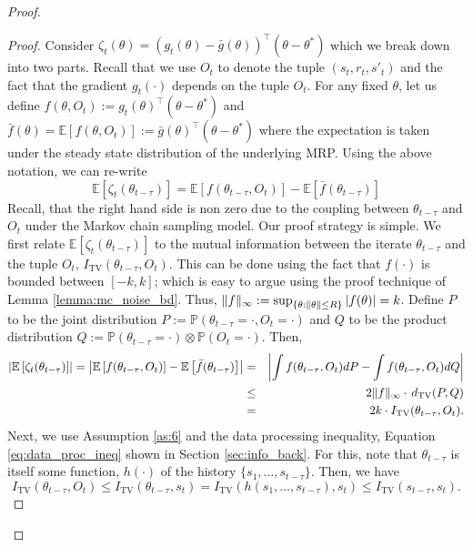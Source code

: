 \documentclass{colt2018} %
\begin{document}
\begin{proof}
\begin{proof}
Consider $\zeta_t(\theta) = \left(g_t(\theta) - \bar{g}(\theta)\right)^\top(\theta - \theta^*)$ which we break down into two parts. Recall that we use $O_t$ to denote the tuple $(s_t,r_t,s'_t)$ and the fact that the gradient $g_t(\cdot)$ depends on the tuple $O_t$. For any fixed $\theta$, let us define $f(\theta, O_t) := g_t(\theta)^\top(\theta - \theta^*)$ and $\bar{f}(\theta) = \mathbb{E} \left[ f(\theta, O_t) \right] := \bar{g}(\theta)^\top (\theta - \theta^*)$ where the expectation is taken under the steady state distribution of the underlying MRP. Using the above notation, we can re-write
\[
\mathbb{E} \left[ \zeta_t(\theta_{t-\tau}) \right] = \mathbb{E} \left[f(\theta_{t-\tau}, O_t)\right] - \mathbb{E} \left[\bar{f}(\theta_{t-\tau})\right]
\]
Recall, that the right hand side is non zero due to the coupling between $\theta_{t-\tau}$ and $O_t$ under the Markov chain sampling model. Our proof strategy is simple. We first relate $\mathbb{E} \left[ \zeta_t(\theta_{t-\tau}) \right]$ to the mutual information between the iterate $\theta_{t-\tau}$ and the tuple $O_t$, $I_{\text{TV}}(\theta_{t-\tau},O_{t})$. This can be done using the fact that $f(\cdot)$ is bounded between $[-k,k]$; which is easy to argue using the proof technique of Lemma \ref{lemma:mc_noise_bd}. Thus, $\| f \|_{\infty} := \sup_{ \{\theta : \norm{\theta} \leq R\} } \abs{f(\theta)} = k$. Define $P$ to be the joint distribution $P := \mathbb{P}(\theta_{t-\tau}=\cdot , O_t=\cdot)$ and $Q$ to be the product distribution $Q := \mathbb{P}(\theta_{t-\tau}=\cdot) \otimes \mathbb{P}(O_t=\cdot)$. Then,
\begin{eqnarray*}
\abs{\mathbb{E} \left[ \zeta_t(\theta_{t-\tau}) \right]} = \abs{\mathbb{E} \left[f(\theta_{t-\tau}, O_t)\right] - \mathbb{E} \left[\bar{f}(\theta_{t-\tau})\right]} 
&=& \abs{ \int f(\theta_{t-\tau},O_t) dP - \int f(\theta_{t-\tau},O_t)dQ } \\
&\leq& 2 \|f\|_{\infty} \cdot \, d_{\text{TV}}(P,Q) \\
&=& 2 k \cdot I_{\text{TV}}(\theta_{t-\tau},O_t).
\end{eqnarray*}
Next, we use Assumption \ref{as:6} and the data processing inequality, Equation \eqref{eq:data_proc_ineq} shown in Section \ref{sec:info_back}. For this, note that $\theta_{t-\tau}$ is itself some function, $h(\cdot)$ of the history $\{ s_1, \ldots, s_{t-\tau} \}$. Then, we have 
\[
I_{\text{TV}}(\theta_{t-\tau},O_t) \leq I_{\text{TV}}(\theta_{t-\tau},s_t) = I_{\text{TV}}(h(s_1, \ldots, s_{t-\tau}),s_t) \leq I_{\text{TV}}(s_{t-\tau},s_t). 
\]
\end{proof}
\end{proof}
\end{document}
